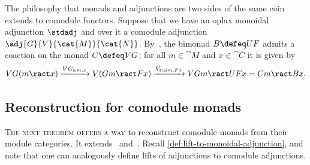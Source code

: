 \begin{example}\label{ex:comodule-monad-over-bimonad}
  The philosophy that monads and adjunctions are two sides of the same coin
  extends to comodule functors.
  Suppose that we have an oplax monoidal adjunction \(\stdadj\)
  and over it a comodule adjunction \(\adj{G}{V}{\cat{M}}{\cat{N}}\).
  By~\cite[Proposition~4.3.1]{Aguiar2012},
  the bimonad \(B \defeq UF\) admits a coaction on the monad \(C \defeq VG\);
  for all \(m \in \cat{M}\) and \(x \in \cat{C}\) it is given by
  \[
    VG(m \ract x) \xrightarrow{VG_{\mathsf{a};m,x}} V(Gm\ract Fx) \xrightarrow{V_{\mathsf{a};Gm,Fx}} VGm \ract UFx = Cm\ract Bx.
  \]
\end{example}

\subsection{Reconstruction for comodule monads}

\textsc{The next theorem offers a way}
to reconstruct comodule monads from their module categories.
It extends~\cite[Proposition~4.1.2]{Aguiar2012}
and~\cite[Lemma~7.10]{Turaev2017}.
Recall \cref{def:lift-to-monoidal-adjunction}, and note that
one can analogously define lifts of adjunctions to comodule adjunctions.

